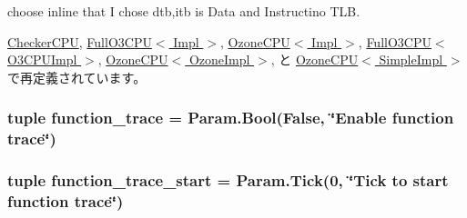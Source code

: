 choose inline that I chose dtb,itb is Data and Instructino TLB. 

\hyperlink{classCheckerCPU_ad2fd039621f87592c4b344d4f8948e78}{CheckerCPU}, \hyperlink{classFullO3CPU_ad2fd039621f87592c4b344d4f8948e78}{FullO3CPU$<$ Impl $>$}, \hyperlink{classOzoneCPU_ad2fd039621f87592c4b344d4f8948e78}{OzoneCPU$<$ Impl $>$}, \hyperlink{classFullO3CPU_ad2fd039621f87592c4b344d4f8948e78}{FullO3CPU$<$ O3CPUImpl $>$}, \hyperlink{classOzoneCPU_ad2fd039621f87592c4b344d4f8948e78}{OzoneCPU$<$ OzoneImpl $>$}, と \hyperlink{classOzoneCPU_ad2fd039621f87592c4b344d4f8948e78}{OzoneCPU$<$ SimpleImpl $>$}で再定義されています。\hypertarget{classBaseCPU_a62486d185ddea16fa00d4d02f5c39c98}{
\subsubsection[{dtb\_\-walker\_\-cache}]{}}
\label{classBaseCPU_a62486d185ddea16fa00d4d02f5c39c98}
\hypertarget{classBaseCPU_a59d7ecff5cf16aa1030de804e2ce2933}{
\subsubsection[{dtb\_\-walker\_\-cache\_\-bus}]{}}
\label{classBaseCPU_a59d7ecff5cf16aa1030de804e2ce2933}
\hypertarget{classBaseCPU_ac5000747a59175f68c1efa108516eb16}{
\subsubsection[{function\_\-trace}]{\setlength{\rightskip}{0pt plus 5cm}tuple {\bf function\_\-trace} = Param.Bool(False, \char`\"{}Enable function trace\char`\"{})}}
\label{classBaseCPU_ac5000747a59175f68c1efa108516eb16}
\hypertarget{classBaseCPU_ad9ee026563aba78102ce184249738572}{
\subsubsection[{function\_\-trace\_\-start}]{\setlength{\rightskip}{0pt plus 5cm}tuple {\bf function\_\-trace\_\-start} = {\bf Param.Tick}(0, \char`\"{}Tick to start function trace\char`\"{})}}
